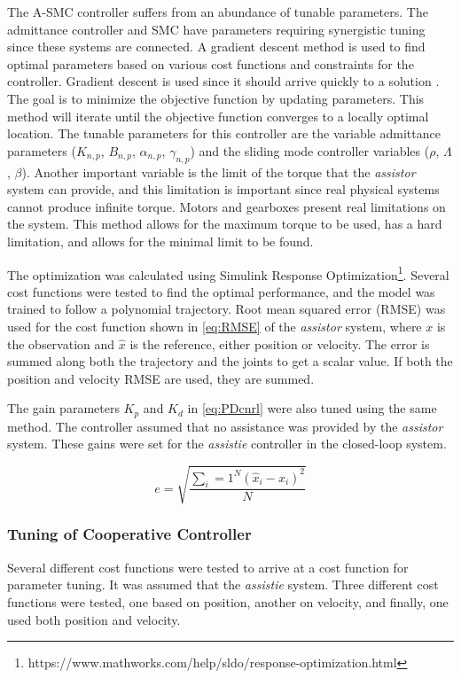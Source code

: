 The A-SMC controller suffers from an abundance of tunable parameters. The admittance controller and SMC have parameters requiring synergistic tuning since these systems are connected.  A gradient descent method is used to find optimal parameters based on various cost functions and constraints for the controller.  Gradient descent is used since it should arrive quickly to a solution  \cite{piltan2012performance} \cite{wang1996course}. The goal is to minimize the objective function by updating parameters. This method will iterate until the objective function converges to a locally optimal location. The tunable parameters for this controller are the variable admittance parameters ($K_{n,p}$, $B_{n,p}$, $\alpha_{n,p}$, $\gamma_{n,p}$) and the sliding mode controller variables ($\rho$, $\Lambda$, $\beta$).  Another important variable is the limit of the torque that the \textit{assistor} system can provide, and this limitation is important since real physical systems cannot produce infinite torque. Motors and gearboxes present real limitations on the system. This method allows for the maximum torque to be used, has a hard limitation, and allows for the minimal limit to be found.


The optimization was calculated using Simulink Response Optimization\footnote{https://www.mathworks.com/help/sldo/response-optimization.html}. Several cost functions were tested to find the optimal performance, and the model was trained to follow a polynomial trajectory. Root mean squared error (RMSE) was used for the cost function shown in \autoref{eq:RMSE} of the \textit{assistor} system, where $x$ is the observation and $\hat{x}$ is the reference, either position or velocity. The error is summed along both the trajectory and the joints to get a scalar value. If both the position and velocity RMSE are used, they are summed.

The gain parameters $K_p$ and $K_d$ in \autoref{eq:PDcnrl} were also tuned using the same method. The controller assumed that no assistance was provided by the \textit{assistor} system. These gains were set for the \textit{assistie} controller in the closed-loop system.

\begin{equation}
    e = \sqrt{ \frac{ \sum_i=1^N ( \hat{x}_i - x_i )^2 }{N}  }
    \label{eq:RMSE}
\end{equation}

\subsubsection{Tuning of Cooperative Controller}
Several different cost functions were tested to arrive at a cost function for parameter tuning. It was assumed that the \textit{assistie} system. Three different cost functions were tested, one based on position, another on velocity, and finally, one used both position and velocity.


